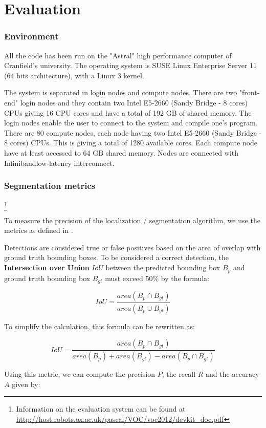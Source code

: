 \chapter{Evaluation}

\subsection{Environment}

All the code has been run on the "Astral" high performance computer of Cranfield's university. The operating system is SUSE Linux Enterprise Server 11 (64 bits architecture), with a Linux 3 kernel.

The system is separated in login nodes and compute nodes. There are two "front-end" login nodes and they contain two Intel E5-2660 (Sandy Bridge - 8 cores) CPUs giving 16 CPU cores and have a total of 192 GB of shared memory. The login nodes enable the user to connect to the system and compile one's program. There are 80 compute nodes, each node having two Intel E5-2660 (Sandy Bridge - 8 cores) CPUs. This is giving a total of 1280 available cores. Each compute node have at least accessed to 64 GB shared memory. Nodes are connected with Infiniband\TM low-latency interconnect.

\subsection{Segmentation metrics}

\footnote{Information on the evaluation system can be found at  \url{http://host.robots.ox.ac.uk/pascal/VOC/voc2012/devkit_doc.pdf}}

To measure the precision of the localization / segmentation algorithm, we use the metrics as defined in \cite{pascalVoc2012}.

Detections are considered true or false positives based on the area of overlap with ground truth bounding boxes. To be considered a correct detection, the \textbf{Intersection over Union} $IoU$ between the predicted bounding box $B_p$ and ground truth bounding box $B_{gt}$ must exceed 50\% by the formula:

$$IoU = \frac{area(B_p \cap B_{gt})}{area(B_p \cup B_{gt})}$$

To simplify the calculation, this formula can be rewritten as:

$$IoU = \frac{area(B_p \cap B_{gt})}{area(B_p) + area(B_{gt}) - area(B_p \cap B_{gt})} $$

Using this metric, we can compute the precision $P$, the recall $R$ and the accuracy $A$ given by:

